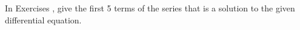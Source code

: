 {\noindent In Exercises}
{, give the first 5 terms of the series that is a solution to the given differential equation.
}
